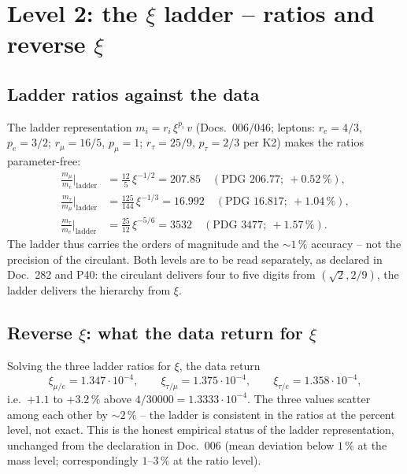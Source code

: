 \section{Level 2: the $\xi$ ladder -- ratios and reverse $\xi$}

\subsection{Ladder ratios against the data}
The ladder representation $m_i = r_i\,\xi^{p_i}\,v$ (Docs.~006/046; leptons:
$r_e=4/3$, $p_e=3/2$; $r_\mu=16/5$, $p_\mu=1$; $r_\tau=25/9$, $p_\tau=2/3$
per K2) makes the ratios parameter-free:
\begin{align}
  \frac{m_\mu}{m_e}\Big|_{\text{ladder}} &= \tfrac{12}{5}\,\xi^{-1/2} = 207.85
  \quad(\text{PDG } 206.77;\ +0.52\,\%),\\
  \frac{m_\tau}{m_\mu}\Big|_{\text{ladder}} &= \tfrac{125}{144}\,\xi^{-1/3} = 16.992
  \quad(\text{PDG } 16.817;\ +1.04\,\%),\\
  \frac{m_\tau}{m_e}\Big|_{\text{ladder}} &= \tfrac{25}{12}\,\xi^{-5/6} = 3532
  \quad(\text{PDG } 3477;\ +1.57\,\%).
\end{align}
The ladder thus carries the orders of magnitude and the $\sim1\,\%$
accuracy -- not the precision of the circulant. Both levels are to be read
separately, as declared in Doc.~282 and P40: the circulant delivers four to
five digits from $(\sqrt2, 2/9)$, the ladder delivers the hierarchy from
$\xi$.

\subsection{Reverse $\xi$: what the data return for $\xi$}
Solving the three ladder ratios for $\xi$, the data return
\begin{equation}
  \xi_{\mu/e} = 1.347\cdot10^{-4},\qquad
  \xi_{\tau/\mu} = 1.375\cdot10^{-4},\qquad
  \xi_{\tau/e} = 1.358\cdot10^{-4},
\end{equation}
i.e.\ $+1.1$ to $+3.2\,\%$ above $4/30000=1.3333\cdot10^{-4}$. The three
values scatter among each other by $\sim2\,\%$ -- the ladder is consistent
in the ratios at the percent level, not exact. This is the honest empirical
status of the ladder representation, unchanged from the declaration in
Doc.~006 (mean deviation below $1\,\%$ at the mass level; correspondingly
$1$--$3\,\%$ at the ratio level).

